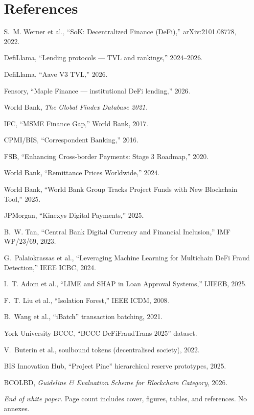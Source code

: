 \documentclass[11pt,a4paper]{article}
\begin{document}
\section*{References}
\small
{}
\begin{enumerate}[label={[\arabic*]},leftmargin=1.6em,itemsep=0.2em]
\item \label{werner2022} S.~M. Werner et al., ``SoK: Decentralized Finance (DeFi),'' arXiv:2101.08778, 2022.
\item \label{defillama} DefiLlama, ``Lending protocols --- TVL and rankings,'' 2024--2026.
\item \label{aavev3} DefiLlama, ``Aave V3 TVL,'' 2026.
\item \label{maple} Fensory, ``Maple Finance --- institutional DeFi lending,'' 2026.
\item \label{findex} World Bank, \textit{The Global Findex Database 2021}.
\item \label{ifc2017} IFC, ``MSME Finance Gap,'' World Bank, 2017.
\item \label{cpmi147} CPMI/BIS, ``Correspondent Banking,'' 2016.
\item \label{fsb2020} FSB, ``Enhancing Cross-border Payments: Stage 3 Roadmap,'' 2020.
\item \label{wbremit} World Bank, ``Remittance Prices Worldwide,'' 2024.
\item World Bank, ``World Bank Group Tracks Project Funds with New Blockchain Tool,'' 2025.
\item JPMorgan, ``Kinexys Digital Payments,'' 2025.
\item \label{tan2023} B.~W. Tan, ``Central Bank Digital Currency and Financial Inclusion,'' IMF WP/23/69, 2023.
\item G.~Palaiokrassas et al., ``Leveraging Machine Learning for Multichain DeFi Fraud Detection,'' IEEE ICBC, 2024.
\item I.~T. Adom et al., ``LIME and SHAP in Loan Approval Systems,'' IJIEEB, 2025.
\item F.~T. Liu et al., ``Isolation Forest,'' IEEE ICDM, 2008.
\item \label{wang2021} B.~Wang et al., ``iBatch'' transaction batching, 2021.
\item York University BCCC, ``BCCC-DeFiFraudTrans-2025'' dataset.
\item V.~Buterin et al., soulbound tokens (decentralised society), 2022.
\item BIS Innovation Hub, ``Project Pine'' hierarchical reserve prototypes, 2025.
\item BCOLBD, \textit{Guideline \& Evaluation Scheme for Blockchain Category}, 2026.
\end{enumerate}

\vspace{2.2mm}
{\footnotesize\color{CoverNavy}\noindent\textit{End of white paper.} Page count includes cover, figures, tables, and references. No annexes.}
\end{document}
